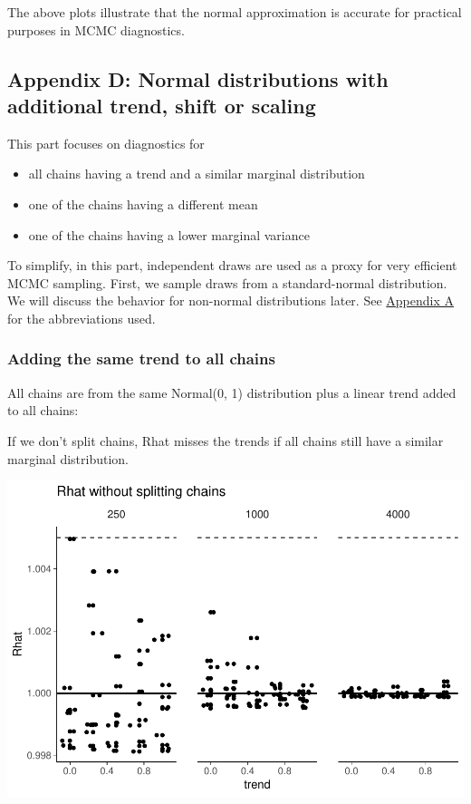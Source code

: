 \documentclass[american,]{article}
\providecommand{\tightlist}{%
  \setlength{\itemsep}{0pt}\setlength{\parskip}{0pt}}
\begin{document}
The above plots illustrate that the normal approximation is accurate for
practical purposes in MCMC diagnostics.

\hypertarget{AppendixD}{%
\subsection*{Appendix D: Normal distributions with additional trend,
shift or scaling}\label{AppendixD}}

This part focuses on diagnostics for

\begin{itemize}
\tightlist
\item
  all chains having a trend and a similar marginal distribution
\item
  one of the chains having a different mean
\item
  one of the chains having a lower marginal variance
\end{itemize}

To simplify, in this part, independent draws are used as a proxy for
very efficient MCMC sampling. First, we sample draws from a
standard-normal distribution. We will discuss the behavior for
non-normal distributions later. See
\protect\hyperlink{AppendixA}{Appendix A} for the abbreviations used.

\hypertarget{adding-the-same-trend-to-all-chains}{%
\subsubsection*{Adding the same trend to all
chains}\label{adding-the-same-trend-to-all-chains}}

All chains are from the same Normal(0, 1) distribution plus a linear
trend added to all chains:

If we don't split chains, Rhat misses the trends if all chains still
have a similar marginal distribution.

\includegraphics{graphics/rhat-same-trend-1.pdf}
\end{document}

